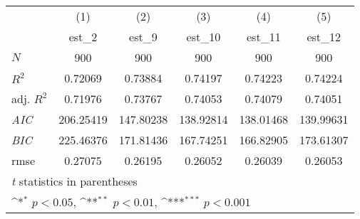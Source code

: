 {
\def\sym#1{\ifmmode^{#1}\else\(^{#1}\)\fi}
\begin{tabular}{l*{5}{c}}
\hline\hline
            &\multicolumn{1}{c}{(1)}&\multicolumn{1}{c}{(2)}&\multicolumn{1}{c}{(3)}&\multicolumn{1}{c}{(4)}&\multicolumn{1}{c}{(5)}\\
            &\multicolumn{1}{c}{est\_2}&\multicolumn{1}{c}{est\_9}&\multicolumn{1}{c}{est\_10}&\multicolumn{1}{c}{est\_11}&\multicolumn{1}{c}{est\_12}\\
\hline
\hline
\(N\)       &         900         &         900         &         900         &         900         &         900         \\
\(R^{2}\)   &     0.72069         &     0.73884         &     0.74197         &     0.74223         &     0.74224         \\
adj. \(R^{2}\)&     0.71976         &     0.73767         &     0.74053         &     0.74079         &     0.74051         \\
\textit{AIC}&   206.25419         &   147.80238         &   138.92814         &   138.01468         &   139.99631         \\
\textit{BIC}&   225.46376         &   171.81436         &   167.74251         &   166.82905         &   173.61307         \\
rmse        &     0.27075         &     0.26195         &     0.26052         &     0.26039         &     0.26053         \\
\hline\hline
\multicolumn{6}{l}{\footnotesize \textit{t} statistics in parentheses}\\
\multicolumn{6}{l}{\footnotesize \sym{*} \(p<0.05\), \sym{**} \(p<0.01\), \sym{***} \(p<0.001\)}\\
\end{tabular}
}
